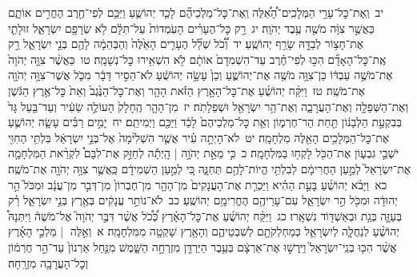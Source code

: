 \documentclass[18pt]{article}
\newcommand{\vart}[1]{\Bfootnote{#1}}	%
\begin{document}
 {\loc יב~}וְֽאֶת־כׇּל־עָרֵ֣י הַמְּלָכִֽים־הָ֠אֵ֠לֶּה וְֽאֶת־כׇּל־מַלְכֵיהֶ֞ם לָכַ֧ד יְהוֹשֻׁ֛עַ וַיַּכֵּ֥ם לְפִי־חֶ֖רֶב הֶחֱרִ֣ים אוֹתָ֑ם כַּאֲשֶׁ֣ר צִוָּ֔ה מֹשֶׁ֖ה עֶ֥בֶד יְהֹוָֽה׃ \startlock
 {\loc יג~}רַ֣ק כׇּל־הֶעָרִ֗ים הָעֹֽמְדוֹת֙ עַל־תִּלָּ֔ם לֹ֥א שְׂרָפָ֖ם יִשְׂרָאֵ֑ל זוּלָתִ֛י אֶת־חָצ֥וֹר לְבַדָּ֖הּ שָׂרַ֥ף יְהוֹשֻֽׁעַ׃ \startlock
 {\loc יד~}וְ֠כֹ֠ל שְׁלַ֞ל הֶעָרִ֤ים הָאֵ֙לֶּה֙ וְהַבְּהֵמָ֔ה  \edtext{בָּזְז֥וּ}{\vart{א=בָּזֲז֥וּ | }}  לָהֶ֖ם בְּנֵ֣י יִשְׂרָאֵ֑ל רַ֣ק אֶֽת־כׇּל־הָאָדָ֞ם הִכּ֣וּ לְפִי־חֶ֗רֶב עַד־הִשְׁמִדָם֙ אוֹתָ֔ם לֹ֥א הִשְׁאִ֖ירוּ כׇּל־נְשָׁמָֽה׃ \startlock
 {\loc טו~}כַּאֲשֶׁ֨ר צִוָּ֤ה יְהֹוָה֙ אֶת־מֹשֶׁ֣ה עַבְדּ֔וֹ כֵּן־צִוָּ֥ה מֹשֶׁ֖ה אֶת־יְהוֹשֻׁ֑עַ וְכֵן֙ עָשָׂ֣ה יְהוֹשֻׁ֔עַ לֹא־הֵסִ֣יר דָּבָ֔ר מִכֹּ֛ל אֲשֶׁר־צִוָּ֥ה יְהֹוָ֖ה אֶת־מֹשֶֽׁה׃ \startlock
 {\loc טז~}וַיִּקַּ֨ח יְהוֹשֻׁ֜עַ אֶת־כׇּל־הָאָ֣רֶץ הַזֹּ֗את הָהָ֤ר וְאֶת־כׇּל־הַנֶּ֙גֶב֙ וְאֵת֙ כׇּל־אֶ֣רֶץ הַגֹּ֔שֶׁן וְאֶת־הַשְּׁפֵלָ֖ה וְאֶת־הָעֲרָבָ֑ה וְאֶת־הַ֥ר יִשְׂרָאֵ֖ל וּשְׁפֵלָתֹֽה׃ \startlock
 {\loc יז~}מִן־הָהָ֤ר הֶֽחָלָק֙ הָעוֹלֶ֣ה שֵׂעִ֔יר וְעַד־בַּ֤עַל גָּד֙ בְּבִקְעַ֣ת הַלְּבָנ֔וֹן תַּ֖חַת הַר־חֶרְמ֑וֹן וְאֵ֤ת כׇּל־מַלְכֵיהֶם֙ לָכַ֔ד וַיַּכֵּ֖ם וַיְמִיתֵֽם׃ \startlock
 {\loc יח~}יָמִ֣ים רַבִּ֗ים עָשָׂ֧ה יְהוֹשֻׁ֛עַ אֶת־כׇּל־הַמְּלָכִ֥ים הָאֵ֖לֶּה מִלְחָמָֽה׃ \startlock
 {\loc יט~}לֹא־הָיְתָ֣ה עִ֗יר אֲשֶׁ֤ר הִשְׁלִ֙ימָה֙ אֶל־בְּנֵ֣י יִשְׂרָאֵ֔ל בִּלְתִּ֥י הַחִוִּ֖י יֹשְׁבֵ֣י גִבְע֑וֹן אֶת־הַכֹּ֖ל לָקְח֥וּ בַמִּלְחָמָֽה׃ \startlock
 {\loc כ~}כִּ֣י מֵאֵ֣ת יְהֹוָ֣ה  |  הָֽיְתָ֡ה לְחַזֵּ֣ק אֶת־לִבָּם֩ לִקְרַ֨את הַמִּלְחָמָ֤ה אֶת־יִשְׂרָאֵל֙ לְמַ֣עַן הַחֲרִימָ֔ם לְבִלְתִּ֥י הֱיוֹת־לָהֶ֖ם תְּחִנָּ֑ה כִּ֚י לְמַ֣עַן הַשְׁמִידָ֔ם כַּֽאֲשֶׁ֛ר צִוָּ֥ה יְהֹוָ֖ה אֶת־מֹשֶֽׁה׃ \startlock
 {\loc כא~}וַיָּבֹ֨א יְהוֹשֻׁ֜עַ בָּעֵ֣ת הַהִ֗יא וַיַּכְרֵ֤ת אֶת־הָעֲנָקִים֙ מִן־הָהָ֤ר מִן־חֶבְרוֹן֙ מִן־דְּבִ֣ר מִן־עֲנָ֔ב וּמִכֹּל֙ הַ֣ר יְהוּדָ֔ה וּמִכֹּ֖ל הַ֣ר יִשְׂרָאֵ֑ל עִם־עָרֵיהֶ֖ם הֶחֱרִימָ֥ם יְהוֹשֻֽׁעַ׃ \startlock
 {\loc כב~}לֹא־נוֹתַ֣ר עֲנָקִ֔ים בְּאֶ֖רֶץ בְּנֵ֣י יִשְׂרָאֵ֑ל רַ֗ק בְּעַזָּ֛ה בְּגַ֥ת וּבְאַשְׁדּ֖וֹד נִשְׁאָֽרוּ׃ \startlock
 {\loc כג~}וַיִּקַּ֨ח יְהוֹשֻׁ֜עַ אֶת־כׇּל־הָאָ֗רֶץ כְּ֠כֹ֠ל אֲשֶׁ֨ר דִּבֶּ֣ר יְהֹוָה֮ אֶל־מֹשֶׁה֒ וַיִּתְּנָהּ֩ יְהוֹשֻׁ֨עַ לְנַחֲלָ֧ה לְיִשְׂרָאֵ֛ל כְּמַחְלְקֹתָ֖ם לְשִׁבְטֵיהֶ֑ם וְהָאָ֥רֶץ שָׁקְטָ֖ה מִמִּלְחָמָֽה׃ 
\startlock
 {\loc א~}וְאֵ֣לֶּה  |  מַלְכֵ֣י הָאָ֗רֶץ אֲשֶׁ֨ר הִכּ֤וּ בְנֵֽי־יִשְׂרָאֵל֙ וַיִּֽרְשׁ֣וּ אֶת־אַרְצָ֔ם בְּעֵ֥בֶר הַיַּרְדֵּ֖ן מִזְרְחָ֣ה הַשָּׁ֑מֶשׁ מִנַּ֤חַל אַרְנוֹן֙ עַד־הַ֣ר חֶרְמ֔וֹן וְכׇל־הָעֲרָבָ֖ה מִזְרָֽחָה׃ \startlock
\end{document}
